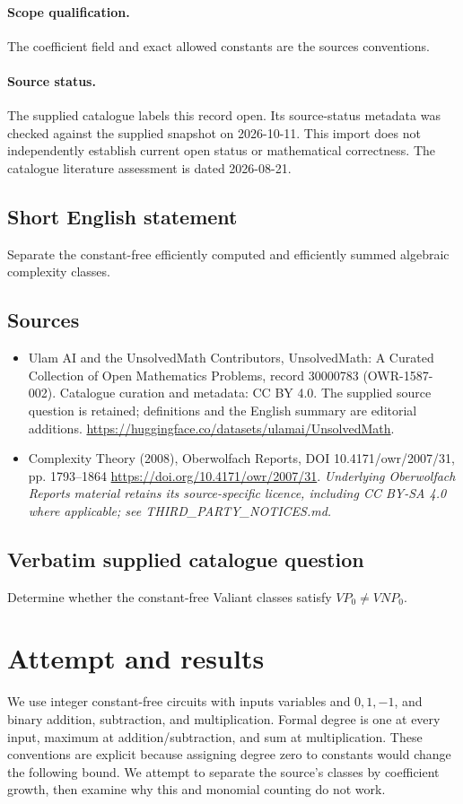 \documentclass[11pt]{article}
\begin{document}
\paragraph{Scope qualification.}
The coefficient field and exact allowed constants are the source\textquotesingle s conventions.
\paragraph{Source status.}
The supplied catalogue labels this record open. Its source-status metadata was checked against the supplied snapshot on 2026-10-11. This import does not independently establish current open status or mathematical correctness. The catalogue literature assessment is dated 2026-08-21.
\subsection{Short English statement}
Separate the constant-free efficiently computed and efficiently summed algebraic complexity classes.
\subsection{Sources}
\begin{itemize}
\item[S1] Ulam AI and the UnsolvedMath Contributors, UnsolvedMath: A Curated Collection of Open Mathematics Problems, record 30000783 (OWR-1587-002). Catalogue curation and metadata: CC BY 4.0. The supplied source question is retained; definitions and the English summary are editorial additions.
\url{https://huggingface.co/datasets/ulamai/UnsolvedMath}.
\item[S2] Complexity Theory (2008), Oberwolfach Reports, DOI 10.4171/owr/2007/31, pp. 1793--1864
\url{https://doi.org/10.4171/owr/2007/31}.
\textit{Underlying Oberwolfach Reports material retains its source-specific licence, including CC BY-SA 4.0 where applicable; see THIRD\_PARTY\_NOTICES.md.}
\end{itemize}
\subsection{Verbatim supplied catalogue question}
Determine whether the constant-free Valiant classes satisfy $VP_0\neq VNP_0$.

\section{Attempt and results}
We use integer constant-free circuits with inputs variables and $0,1,-1$,
and binary addition, subtraction, and multiplication. Formal degree is one
at every input, maximum at addition/subtraction, and sum at multiplication.
These conventions are explicit because assigning degree zero to constants
would change the following bound. We attempt to separate the source's classes
by coefficient growth, then examine why this and monomial counting do not work.
\end{document}
